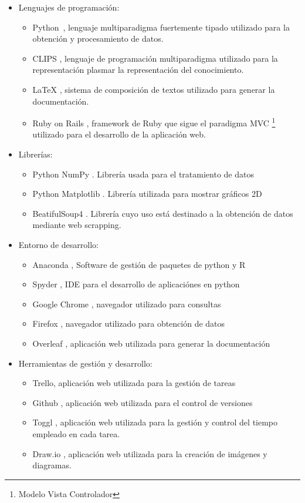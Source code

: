 \documentclass[11pt,a4paper,twoside,final]{article}
\begin{document}
\begin{itemize}
    \item Lenguajes de programación:
    \begin{itemize}
        \item Python~\cite{python}, lenguaje multiparadigma fuertemente tipado utilizado para la obtención y procesamiento de datos.
        \item CLIPS \cite{clips}, lenguaje de programación multiparadigma utilizado para la representación plasmar la representación del conocimiento.
        \item LaTeX \cite{latex}, sistema de composición de textos utilizado para generar la documentación.
        \item Ruby on Rails \cite{ror}, framework de Ruby que sigue el paradigma MVC \footnote{Modelo Vista Controlador} utilizado para el desarrollo de la aplicación web.
    \end{itemize}
    \item Librerías:
    \begin{itemize}
        \item Python NumPy \cite{numpy}. Librería usada para el tratamiento de datos
        \item Python Matplotlib \cite{matplotlib}. Librería utilizada para mostrar gráficos 2D
        \item BeatifulSoup4 \cite{beatifulsoup}. Librería cuyo uso está destinado a la obtención de datos mediante web scrapping.
    \end{itemize}
    \item Entorno de desarrollo:
    \begin{itemize}
        \item Anaconda \cite{anaconda}, Software de gestión de paquetes de python y R
        \item Spyder \cite{spyder}, IDE para el desarrollo de aplicaciónes en python
        \item Google Chrome \cite{chrome}, navegador utilizado para consultas
        \item Firefox \cite{firefox}, navegador utilizado para obtención de datos
        \item Overleaf \cite{overleaf}, aplicación web utilizada para generar la documentación
    \end{itemize}
    \item Herramientas de gestión y desarrollo:
    \begin{itemize}
        \item Trello, aplicación web utilizada para la gestión de tareas
        \item Github \cite{github}, aplicación web utilizada para el control de versiones \cite{git}
        \item Toggl \cite{toggl}, aplicación web utilizada para la gestión y control del tiempo empleado en cada tarea.
        \item Draw.io \cite{drawio}, aplicación web utilizada para la creación de imágenes y diagramas.
    \end{itemize}
\end{itemize}
\end{document}
